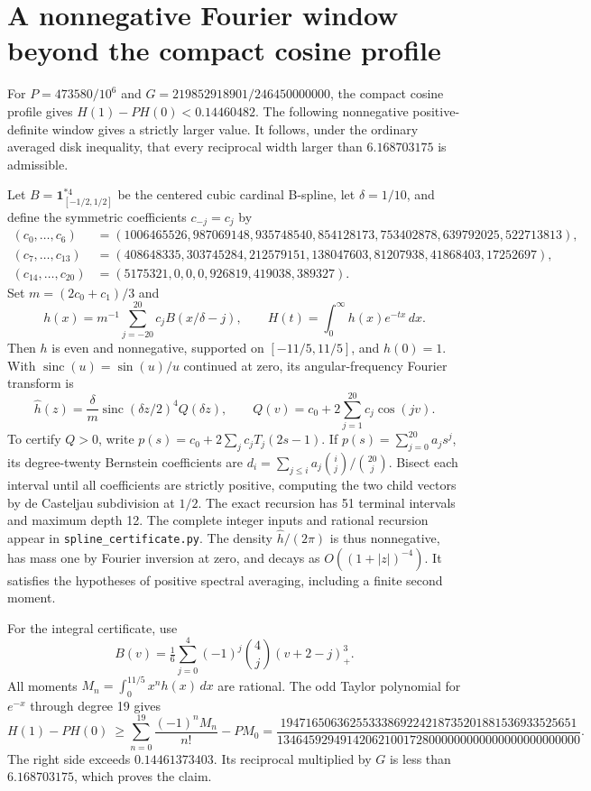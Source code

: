 \section{A nonnegative Fourier window beyond the compact cosine profile}
\label{sec:spline-window}
For $P=473580/10^6$ and $G=219852918901/246450000000$, the compact
cosine profile gives $H(1)-P H(0)<0.14460482$. The following
nonnegative positive-definite window gives a strictly larger value.
It follows, under the ordinary averaged disk inequality, that every
reciprocal width larger than $6.168703175$ is admissible.

Let $B=\mathbf1_{[-1/2,1/2]}^{*4}$ be the centered cubic cardinal
B-spline, let $\delta=1/10$, and define the symmetric coefficients
$c_{-j}=c_j$ by
\begin{align*}
(c_0,\ldots,c_6)&=(1006465526,987069148,935748540,854128173,753402878,
639792025,522713813),\\
(c_7,\ldots,c_{13})&=(408648335,303745284,212579151,138047603,81207938,
41868403,17252697),\\
(c_{14},\ldots,c_{20})&=(5175321,0,0,0,926819,419038,389327).
\end{align*}
Set $m=(2c_0+c_1)/3$ and
\[
 h(x)=m^{-1}\sum_{j=-20}^{20}c_j B(x/\delta-j),\qquad
 H(t)=\int_0^\infty h(x)e^{-tx}\,dx.
\]
Then $h$ is even and nonnegative, supported on $[-11/5,11/5]$,
and $h(0)=1$. With $\operatorname{sinc}(u)=\sin(u)/u$ continued
at zero, its angular-frequency Fourier transform is
\[
 \widehat h(z)=\frac{\delta}{m}\operatorname{sinc}(\delta z/2)^4
                Q(\delta z),\qquad
 Q(v)=c_0+2\sum_{j=1}^{20}c_j\cos(jv).
\]
To certify $Q>0$, write $p(s)=c_0+2\sum_j c_j T_j(2s-1)$.
If $p(s)=\sum_{j=0}^{20}a_js^j$, its degree-twenty Bernstein
coefficients are $d_i=\sum_{j\le i}a_j\binom ij/\binom{20}j$.
Bisect each interval until all coefficients are strictly positive,
computing the two child vectors by de Casteljau subdivision at $1/2$.
The exact recursion has 51 terminal intervals and maximum depth 12.
The complete integer inputs and rational recursion appear in
\texttt{spline\_certificate.py}. The density $\widehat h/(2\pi)$
is thus nonnegative, has mass one by Fourier inversion at zero, and
decays as $O((1+|z|)^{-4})$. It satisfies the hypotheses of positive
spectral averaging, including a finite second moment.

For the integral certificate, use
\[
 B(v)=\tfrac16\sum_{j=0}^4(-1)^j\binom4j(v+2-j)_+^3 .
\]
All moments $M_n=\int_0^{11/5}x^n h(x)\,dx$ are rational.
The odd Taylor polynomial for $e^{-x}$ through degree 19 gives
\[
 H(1)-PH(0)\ \ge \sum_{n=0}^{19}\frac{(-1)^n M_n}{n!}-P M_0
 =\frac{19471650636255333869224218735201881536933525651}
 {134645929491420621001728000000000000000000000000}.
\]
The right side exceeds $0.14461373403$. Its reciprocal multiplied by
$G$ is less than $6.168703175$, which proves the claim.


